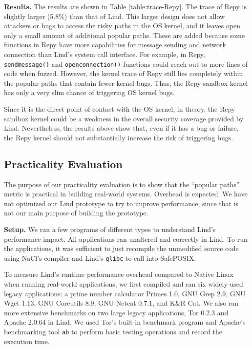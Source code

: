 {{{\noindent
\textbf{Results.}
The results are shown in Table \ref{table:trace-Repy}.
The trace of Repy is slightly larger (5.8\%) than that of Lind.
This larger design does not allow attackers or bugs to
access the risky paths in the OS kernel, and it leaves open only a small amount of
additional popular paths. These are added because some functions in Repy
have more capabilities for message sending and network connection than Lind's
system call interface.
For example, in Repy,
\texttt{sendmessage()} and \texttt{openconnection()}
functions could reach out to more lines of code when fuzzed. However, the kernel
trace of Repy still lies completely within the popular paths that
contain fewer kernel bugs. Thus, the Repy sandbox kernel
has only a very slim chance of triggering OS kernel bugs.

Since it is the direct point of contact with the OS kernel, in theory, the Repy
 sandbox kernel could be a weakness in the overall security coverage provided by Lind.
Nevertheless, the results above show that, even if it has a
bug or failure, the Repy kernel should not substantially increase the risk of triggering bugs.

\subsection{Practicality Evaluation}
\label{Performance-Evaluation}

The purpose of our practicality evaluation is to show that the 
``popular paths'' metric is practical in building real-world systems. Overhead is expected. 
We have not optimized our Lind prototype to try to improve performance, since that is not 
our main purpose of building the prototype. 


\noindent
\textbf{Setup.}
We ran a few programs of different types to understand Lind's performance
impact.  All applications ran unaltered and correctly in Lind. To run the
applications, it was sufficient to just recompile the unmodified
source code using NaCl's compiler and Lind's \texttt{glibc} to call
into SafePOSIX.

To measure Lind's runtime performance overhead compared to Native Linux
 when running real-world applications,
we first compiled and ran six widely-used legacy applications:
a prime number calculator Primes 1.0,
GNU Grep 2.9, GNU Wget 1.13, GNU Coreutils 8.9,
GNU Netcat 0.7.1, and K\&R Cat.
We also ran more extensive benchmarks on two large legacy applications,
Tor 0.2.3 and Apache 2.0.64 in Lind.
We used Tor's built-in benchmark program and Apache's benchmarking tool
\texttt{ab} to perform basic testing operations and record the execution time.

}}}
